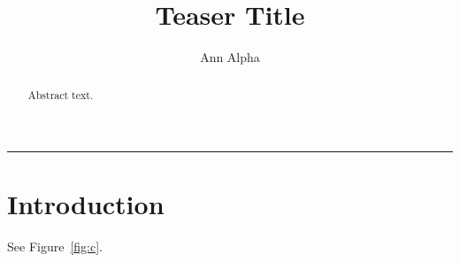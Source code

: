 \documentclass{article}
\begin{document}
\title{Teaser Title}
\author{Ann Alpha}
\maketitle
\begin{center}
\rule{2cm}{1cm}
\label{fig:c}
\end{center}
\begin{abstract}
Abstract text.
\end{abstract}
\section{Introduction}
See Figure~\ref{fig:c}.
\end{document}
